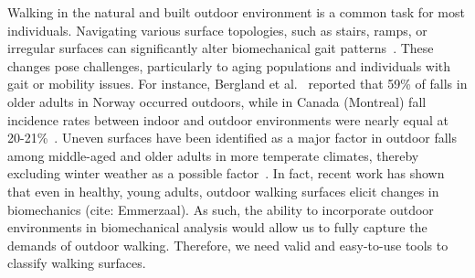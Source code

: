 \documentclass[sensors,article,submit,pdftex,moreauthors]{Definitions/mdpi}
\begin{document}
\label{sec:introduction}

Walking in the natural and built outdoor environment is a common task for most individuals. Navigating various surface topologies, such as stairs, ramps, or irregular surfaces can significantly alter biomechanical gait patterns~\cite{ippersiel_impact_2022, Dixon_2018, dixon_late-cueing_2018, vieira_gait_2017, menz_acceleration_2003}. These changes pose challenges, particularly to aging populations and individuals with gait or mobility issues. For instance, Bergland et al.~\cite{Bergland_1998} reported that 59\% of falls in older adults in Norway occurred outdoors, while in Canada (Montreal) fall incidence rates between indoor and outdoor environments were nearly equal at 20-21\%~\cite{Oloughlin_f1994}. Uneven surfaces have been identified as a major factor in outdoor falls among middle-aged and older adults in more temperate climates, thereby excluding winter weather as a possible factor~\cite{li_2006}. In fact, recent work has shown that even in healthy, young adults, outdoor walking surfaces elicit changes in biomechanics (cite: Emmerzaal). 
As such, the ability to incorporate outdoor environments in biomechanical analysis would allow us to fully capture the demands of outdoor walking. Therefore, we need valid and easy-to-use tools to classify walking surfaces.


\end{document}
